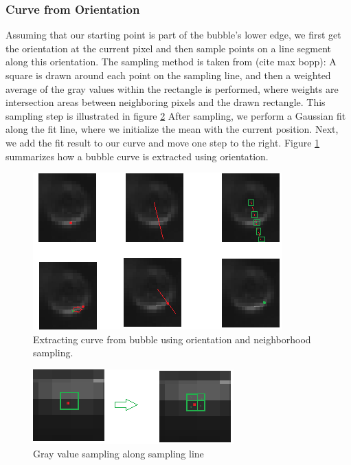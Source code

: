 	
	
	
	
	
	
			\subsubsection{Curve from Orientation}
				Assuming that our starting point is part of the bubble's lower edge, we first get the orientation at the current pixel and then sample points on a line segment along this orientation. The sampling method is taken from (cite max bopp): A square is drawn around each point on the sampling line, and then a weighted average of the gray values within the rectangle is performed, where weights are intersection areas between neighboring pixels and the drawn rectangle. This sampling step is illustrated in figure \ref{fig:subpixel_sampling}
				 After sampling, we perform a Gaussian fit along the fit line, where we initialize the mean with the current position. Next, we add the fit result to our curve and move one step to the right. Figure \ref{fig:curve_from_orientation} summarizes how a bubble curve is extracted using orientation. 
				 
				 \begin{figure}
				 	\centering
				 	\includegraphics[scale=1]{images/curve_from_orientation.png}
				 	\caption{Extracting curve from bubble using orientation and neighborhood sampling.}
				 	\label{fig:curve_from_orientation}
				 \end{figure}
				 
				 \begin{figure}
				 	\centering
				 	\includegraphics[scale=1]{images/subpixel_sampling.png}
				 	\caption{Gray value sampling along sampling line}
				 	\label{fig:subpixel_sampling}
				 \end{figure}
				 
